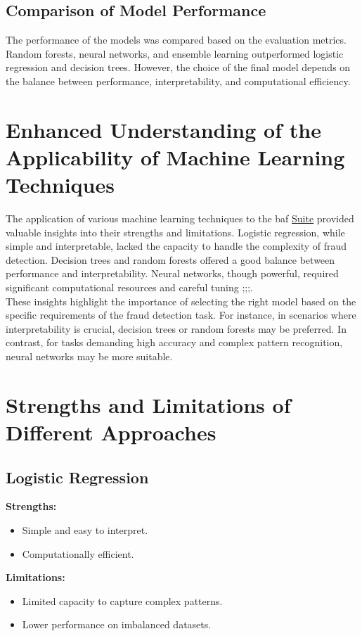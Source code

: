 \documentclass[12pt,a4paper]{report}
\begin{document}
\subsection{Comparison of Model Performance}
The performance of the models was compared based on the evaluation metrics. Random forests, neural networks, and ensemble learning outperformed logistic regression and decision trees. However, the choice of the final model depends on the balance between performance, interpretability, and computational efficiency.








\section{Enhanced Understanding of the Applicability of Machine Learning Techniques}
The application of various machine learning techniques to the \acrshort{baf} \href{https://www.kaggle.com/datasets/sgpjesus/bank-account-fraud-dataset-neurips-2022/code}{Suite} provided valuable insights into their strengths and limitations. Logistic regression, while simple and interpretable, lacked the capacity to handle the complexity of fraud detection. Decision trees and random forests offered a good balance between performance and interpretability. Neural networks, though powerful, required significant computational resources and careful tuning 
\citep{bao2020detecting};\citep{pan2024machine};\citep{seera2024intelligent};\citep{chawla2002smote}.\\

These insights highlight the importance of selecting the right model based on the specific requirements of the fraud detection task. For instance, in scenarios where interpretability is crucial, decision trees or random forests may be preferred. In contrast, for tasks demanding high accuracy and complex pattern recognition, neural networks may be more suitable.


\section{Strengths and Limitations of Different Approaches}
\subsection{Logistic Regression}
\textbf{Strengths:}
\begin{itemize}
    \item Simple and easy to interpret.
    \item Computationally efficient.
\end{itemize}
\textbf{Limitations:}
\begin{itemize}
    \item Limited capacity to capture complex patterns.
    \item Lower performance on imbalanced datasets.
\end{itemize}
\end{document}

